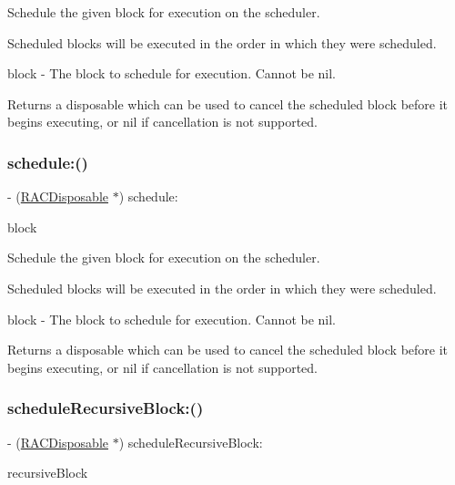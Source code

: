 Schedule the given block for execution on the scheduler.

Scheduled blocks will be executed in the order in which they were scheduled.

block -\/ The block to schedule for execution. Cannot be nil.

Returns a disposable which can be used to cancel the scheduled block before it begins executing, or nil if cancellation is not supported. \mbox{\label{interface_r_a_c_scheduler_ab8e7e6634a86734797fa8db0919f9c16}} 
\subsubsection{\texorpdfstring{schedule\+:()}{schedule:()}\hspace{0.1cm}{\footnotesize\ttfamily [3/3]}}
{\footnotesize\ttfamily -\/ (\mbox{\hyperlink{interface_r_a_c_disposable}{R\+A\+C\+Disposable}} $\ast$) schedule\+: \begin{DoxyParamCaption}\item[{(void($^\wedge$)(void))}]{block }\end{DoxyParamCaption}}

Schedule the given block for execution on the scheduler.

Scheduled blocks will be executed in the order in which they were scheduled.

block -\/ The block to schedule for execution. Cannot be nil.

Returns a disposable which can be used to cancel the scheduled block before it begins executing, or nil if cancellation is not supported. \mbox{\label{interface_r_a_c_scheduler_aff5ee7293a775dc51a4ae35fb91ab13b}} 
\subsubsection{\texorpdfstring{schedule\+Recursive\+Block\+:()}{scheduleRecursiveBlock:()}\hspace{0.1cm}{\footnotesize\ttfamily [1/3]}}
{\footnotesize\ttfamily -\/ (\mbox{\hyperlink{interface_r_a_c_disposable}{R\+A\+C\+Disposable}} $\ast$) schedule\+Recursive\+Block\+: \begin{DoxyParamCaption}\item[{(R\+A\+C\+Scheduler\+Recursive\+Block)}]{recursive\+Block }\end{DoxyParamCaption}}

